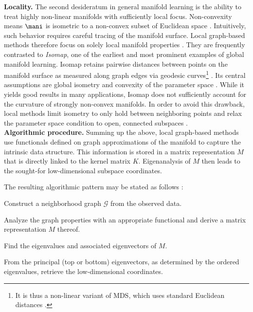 \textbf{Locality.} The second desideratum in general manifold learning is the 
ability to treat highly non-linear manifolds with sufficiently local focus.
Non-convexity means $\mani$ is isometric to a non-convex subset of Euclidean 
space \citep{donohogrimes2003}. 
Intuitively, such behavior requires careful tracing of the manifold surface.
Local graph-based methods therefore focus on solely local manifold properties \citep{cayton2005}.
They are frequently contrasted to \textit{Isomap}, one of the 
earliest and most prominent examples of global manifold learning.
Isomap retains pairwise distances between points on the manifold surface as 
measured along graph edges via geodesic curves\footnote{
It is thus a non-linear variant of MDS, which uses standard Euclidean distances 
\citep{tenenbaumdesilvalangford2000}.
} \citep{tenenbaumdesilvalangford2000}.
Its central assumptions are global isometry and convexity of the parameter 
space \citep{tenenbaumdesilvalangford2000}.
While it yields good results in many applications, Isomap does not sufficiently 
account for the curvature of strongly non-convex manifolds.
In order to avoid this drawback, local methods limit isometry to only hold 
between neighboring points and relax the parameter space 
condition to open, connected subspaces \citep{donohogrimes2003}.
\\

\textbf{Algorithmic procedure.}
Summing up the above, local graph-based methods use functionals defined on graph approximations of the manifold to capture the intrinsic data structure.
This information is stored in a matrix representation $M$ that is directly 
linked to the kernel matrix $K$.
Eigenanalysis of $M$ then leads to the sought-for low-dimensional subspace 
coordinates.

The resulting algorithmic pattern may be stated as follows 
\citep{bengioetal2003}:

\begin{tight_enumerate}
  \item Construct a neighborhood graph $\mathcal{G}$ from the observed data.
  \item Analyze the graph properties with an appropriate functional and derive 
  a matrix representation $M$ thereof.
  \item Find the eigenvalues and associated eigenvectors of $M$.
  \item From the principal (top or bottom) eigenvectors, as determined by the 
  ordered eigenvalues, retrieve the low-dimensional coordinates.
\end{tight_enumerate}

